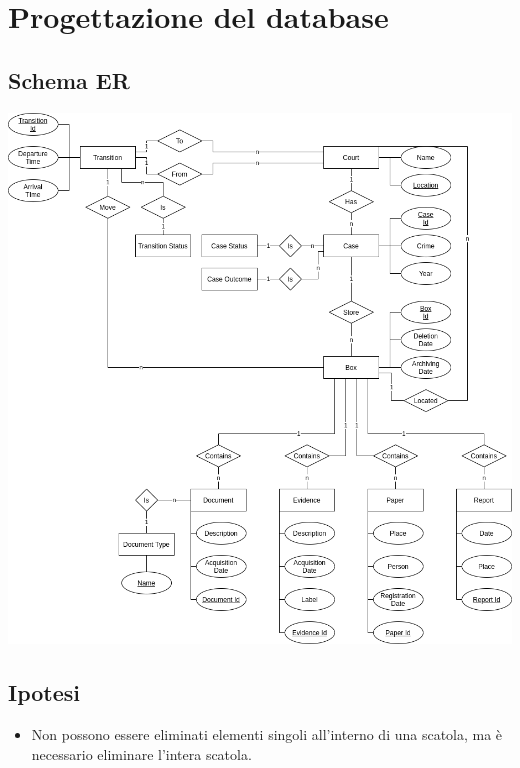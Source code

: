 \section{Progettazione del database}
\subsection{Schema ER}

\begin{adjustwidth}{-5cm}{-5cm}
    \vspace{\fill}
    \begin{center}
        \includegraphics[scale=0.50]{./images/er.png}
    \end{center}
    \vspace{\fill}
\end{adjustwidth}

\subsection{Ipotesi}

\begin{itemize}
    \item Non possono essere eliminati elementi singoli all'interno di una scatola, ma è necessario eliminare l'intera scatola.
\end{itemize}

